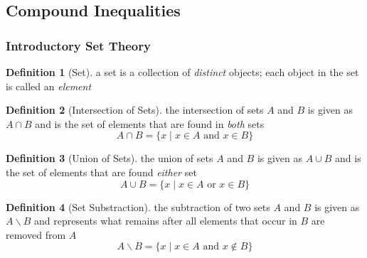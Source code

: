 \documentclass[addpoints,12pt]{exam}
\newcommand{\topic}{Compound Inequalities}
\theoremstyle{definition}
\newtheorem{definition}{Definition}[subsection]
\begin{document}
\setcounter{section}{9}
\setcounter{subsection}{1}

\subsection{\topic}

\subsubsection*{Introductory Set Theory}

\begin{definition}[Set]
a set is a collection of \emph{distinct} objects; each object in the set is called an \emph{element}
\end{definition}

\vspace{.2in}
\begin{definition}[Intersection of Sets]
the intersection of sets $A$ and $B$ is given as $A\cap B$ and is the set of elements that are found in \emph{both} sets
\[A \cap B = \{x \mid x \in A \text{ and } x \in B\}\]

\end{definition}

\vspace{.2in}
\begin{definition}[Union of Sets]
the union of sets $A$ and $B$ is given as $A \cup B$ and is the set of elements that are found \emph{either} set
\[A \cup B = \{x \mid x \in A \text{ or } x \in B\}\]
\end{definition}

\vspace{.2in}
\begin{definition}[Set Substraction]
the subtraction of two sets $A$ and $B$ is given as $A\backslash B$ and represents what remains after all elements that occur in $B$ are removed from $A$
\[ A\backslash B = \{x \mid x \in A \text{ and } x \notin B\}\]
\end{definition}
\end{document}
